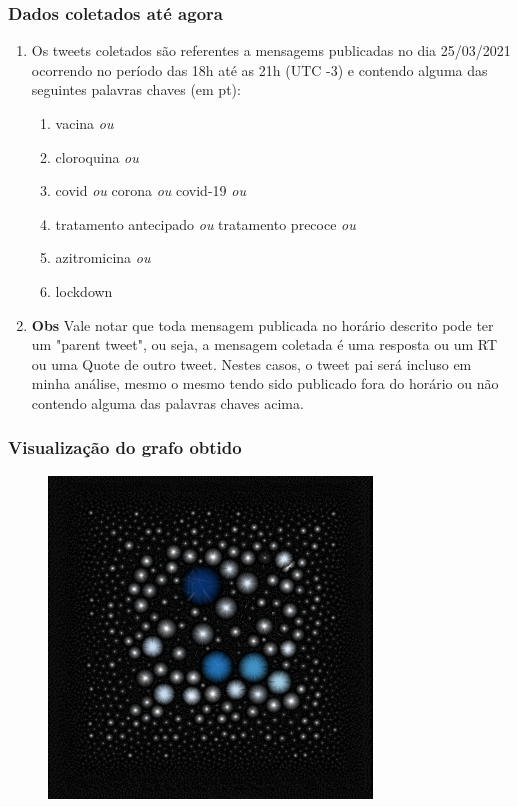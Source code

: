 \documentclass[11pt]{beamer}
\theoremstyle{remark}
\theoremstyle{definition}
\theoremstyle{plain}
\begin{document}
	\begin{frame}
		\frametitle{Dados coletados até agora}
		\begin{enumerate}
			\item Os tweets coletados são referentes a mensagems publicadas no
				dia 25/03/2021 ocorrendo no período das 18h até as 21h (UTC -3)
				e contendo alguma das seguintes palavras chaves (em pt):
				\begin{enumerate}
					\item vacina \textit{ou}
					\item cloroquina  \textit{ou}
					\item covid \textit{ou} corona \textit{ou} covid-19 \textit{ou}
					\item tratamento antecipado \textit{ou} tratamento precoce \textit{ou}
					\item azitromicina \textit{ou}
					\item lockdown
				\end{enumerate}
			\item \textbf{Obs} Vale notar que toda mensagem publicada no horário 
				descrito pode ter um "parent tweet", ou seja,
				a mensagem coletada é uma resposta ou um RT ou uma Quote
				de outro tweet. Nestes casos, o tweet pai será incluso 
				em minha análise, mesmo o mesmo tendo sido publicado fora 
				do horário ou não contendo alguma das palavras chaves acima.
		\end{enumerate}
		\end{frame}

	\begin{frame}
		\frametitle{Visualização do grafo obtido}
			\begin{figure}[h]
				\centering
                \includegraphics[scale=0.6]{pics/treeGraph_v01_coloured_scaled.png}
			\end{figure}
		\end{frame}
\end{document}
